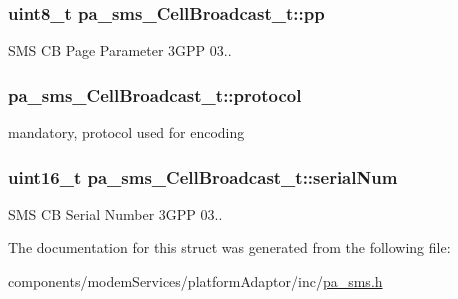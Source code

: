 \subsubsection[{\texorpdfstring{pp}{pp}}]{\setlength{\rightskip}{0pt plus 5cm}uint8\+\_\+t pa\+\_\+sms\+\_\+\+Cell\+Broadcast\+\_\+t\+::pp}\hypertarget{structpa__sms___cell_broadcast__t_ad7946788c7f6fbd84787c05f91ac11f7}{}\label{structpa__sms___cell_broadcast__t_ad7946788c7f6fbd84787c05f91ac11f7}


S\+MS CB Page Parameter 3\+G\+PP 03.. 

\subsubsection[{\texorpdfstring{protocol}{protocol}}]{ pa\+\_\+sms\+\_\+\+Cell\+Broadcast\+\_\+t\+::protocol}\hypertarget{structpa__sms___cell_broadcast__t_a8d93f8f943618e61f54cac753aa6f711}{}\label{structpa__sms___cell_broadcast__t_a8d93f8f943618e61f54cac753aa6f711}


mandatory, protocol used for encoding 

\subsubsection[{\texorpdfstring{serial\+Num}{serialNum}}]{\setlength{\rightskip}{0pt plus 5cm}uint16\+\_\+t pa\+\_\+sms\+\_\+\+Cell\+Broadcast\+\_\+t\+::serial\+Num}\hypertarget{structpa__sms___cell_broadcast__t_a2535d69dd64dfdf9f8eeed3072a2937e}{}\label{structpa__sms___cell_broadcast__t_a2535d69dd64dfdf9f8eeed3072a2937e}


S\+MS CB Serial Number 3\+G\+PP 03.. 



The documentation for this struct was generated from the following file\+:\begin{DoxyCompactItemize}
\item 
components/modem\+Services/platform\+Adaptor/inc/\hyperlink{pa__sms_8h}{pa\+\_\+sms.\+h}\end{DoxyCompactItemize}
